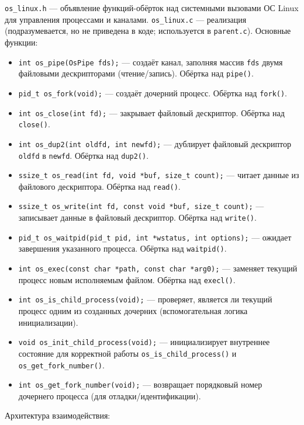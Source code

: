 \texttt{os\_linux.h} --- объявление функций-обёрток над системными вызовами ОС Linux для управления процессами и каналами.  
\texttt{os\_linux.c} --- реализация (подразумевается, но не приведена в коде; используется в \texttt{parent.c}).  
Основные функции:
\begin{itemize}
\item \texttt{int os\_pipe(OsPipe fds);} --- создаёт канал, заполняя массив \texttt{fds} двумя файловыми дескрипторами (чтение/запись). Обёртка над \texttt{pipe()}.
\item \texttt{pid\_t os\_fork(void);} --- создаёт дочерний процесс. Обёртка над \texttt{fork()}.
\item \texttt{int os\_close(int fd);} --- закрывает файловый дескриптор. Обёртка над \texttt{close()}.
\item \texttt{int os\_dup2(int oldfd, int newfd);} --- дублирует файловый дескриптор \texttt{oldfd} в \texttt{newfd}. Обёртка над \texttt{dup2()}.
\item \texttt{ssize\_t os\_read(int fd, void *buf, size\_t count);} --- читает данные из файлового дескриптора. Обёртка над \texttt{read()}.
\item \texttt{ssize\_t os\_write(int fd, const void *buf, size\_t count);} --- записывает данные в файловый дескриптор. Обёртка над \texttt{write()}.
\item \texttt{pid\_t os\_waitpid(pid\_t pid, int *wstatus, int options);} --- ожидает завершения указанного процесса. Обёртка над \texttt{waitpid()}.
\item \texttt{int os\_exec(const char *path, const char *arg0);} --- заменяет текущий процесс новым исполняемым файлом. Обёртка над \texttt{execl()}.
\item \texttt{int os\_is\_child\_process(void);} --- проверяет, является ли текущий процесс одним из созданных дочерних (вспомогательная логика инициализации).
\item \texttt{void os\_init\_child\_process(void);} --- инициализирует внутреннее состояние для корректной работы \texttt{os\_is\_child\_process()} и \texttt{os\_get\_fork\_number()}.
\item \texttt{int os\_get\_fork\_number(void);} --- возвращает порядковый номер дочернего процесса (для отладки/идентификации).
\end{itemize}

\vspace{2\baselineskip}

Архитектура взаимодействия:

